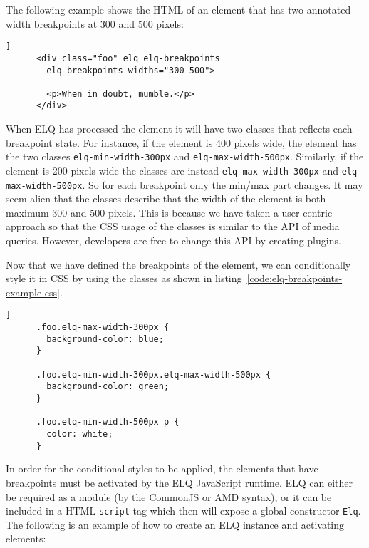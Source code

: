 \documentclass{acm_proc_article-sp}
\newcommand{\code}[1]{\texttt{#1}}
\newcommand{\elq}{ELQ}
\begin{document}
    The following example shows the HTML of an element that has two annotated width breakpoints at 300 and 500 pixels:

    \begin{lstlisting}[gobble=6,caption={},captionpos=b,label={}]]
      <div class="foo" elq elq-breakpoints
        elq-breakpoints-widths="300 500">
        
        <p>When in doubt, mumble.</p>
      </div>
    \end{lstlisting}

    When \elq{} has processed the element it will have two classes that reflects each breakpoint state.
    For instance, if the element is 400 pixels wide, the element has the two classes \code{elq-min-width-300px} and \code{elq-max-width-500px}.
    Similarly, if the element is 200 pixels wide the classes are instead \code{elq-max-width-300px} and \code{elq-max-width-500px}.
    So for each breakpoint only the min/max part changes.
    It may seem alien that the classes describe that the width of the element is both maximum 300 and 500 pixels.
    This is because we have taken a user-centric approach so that the CSS usage of the classes is similar to the API of media queries.
    However, developers are free to change this API by creating plugins.

    Now that we have defined the breakpoints of the element, we can conditionally style it in CSS by using the classes as shown in listing~\ref{code:elq-breakpoints-example-css}.

    \begin{lstlisting}[gobble=6,caption={Example usage of the breakpoint state classes in CSS.},captionpos=b,label={code:elq-breakpoints-example-css}]]
      .foo.elq-max-width-300px {
        background-color: blue;
      }

      .foo.elq-min-width-300px.elq-max-width-500px {
        background-color: green;
      }

      .foo.elq-min-width-500px p {
        color: white;
      }
    \end{lstlisting}

    In order for the conditional styles to be applied, the elements that have breakpoints must be activated by the \elq{} JavaScript runtime.
    \elq{} can either be required as a module (by the CommonJS or AMD syntax), or it can be included in a HTML \code{script} tag which then will expose a global constructor \code{Elq}.
    The following is an example of how to create an \elq{} instance and activating elements:
\end{document}
